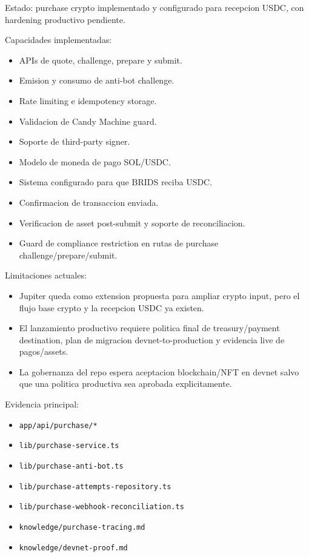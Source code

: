 \documentclass[
  10pt,
  letterpaper,
]{article}
\providecommand{\tightlist}{%
  \setlength{\itemsep}{0pt}\setlength{\parskip}{0pt}}
\let\oldtexttt\texttt
\renewcommand{\texttt}[1]{\oldtexttt{\small #1}}
\begin{document}
Estado: purchase crypto implementado y configurado para recepcion USDC,
con hardening productivo pendiente.

Capacidades implementadas:

\begin{itemize}
\tightlist
\item
  APIs de quote, challenge, prepare y submit.
\item
  Emision y consumo de anti-bot challenge.
\item
  Rate limiting e idempotency storage.
\item
  Validacion de Candy Machine guard.
\item
  Soporte de third-party signer.
\item
  Modelo de moneda de pago SOL/USDC.
\item
  Sistema configurado para que BRIDS reciba USDC.
\item
  Confirmacion de transaccion enviada.
\item
  Verificacion de asset post-submit y soporte de reconciliacion.
\item
  Guard de compliance restriction en rutas de purchase
  challenge/prepare/submit.
\end{itemize}

Limitaciones actuales:

\begin{itemize}
\tightlist
\item
  Jupiter queda como extension propuesta para ampliar crypto input, pero
  el flujo base crypto y la recepcion USDC ya existen.
\item
  El lanzamiento productivo requiere politica final de treasury/payment
  destination, plan de migracion devnet-to-production y evidencia live
  de pagos/assets.
\item
  La gobernanza del repo espera aceptacion blockchain/NFT en devnet
  salvo que una politica productiva sea aprobada explicitamente.
\end{itemize}

Evidencia principal:

\begin{itemize}
\tightlist
\item
  \texttt{app/api/purchase/*}
\item
  \texttt{lib/purchase-service.ts}
\item
  \texttt{lib/purchase-anti-bot.ts}
\item
  \texttt{lib/purchase-attempts-repository.ts}
\item
  \texttt{lib/purchase-webhook-reconciliation.ts}
\item
  \texttt{knowledge/purchase-tracing.md}
\item
  \texttt{knowledge/devnet-proof.md}
\end{itemize}
\end{document}
